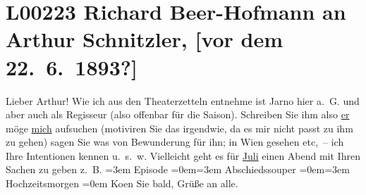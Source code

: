 

\section[Richard Beer-Hofmann an Arthur Schnitzler, {[}vor dem 22. 6. 1893?{]}]{L00223 Richard Beer-Hofmann an Arthur Schnitzler, {[}vor dem
               22. 6. 1893?{]}}
\nopagebreak{}
\rehead{ }\normalsize\beginnumbering{}
\toendnotes[C]{\smallbreak\pagebreak[2]}
\toendnotes[C]{\smallbreak}
\pstart
           \textcolor{gray}{\textbf{\label{T_L00223-1v}\label{T_L00223-1}}}\pend
           
\pstart{}{\pb}Lieber Arthur!\pend\vspace{0.5em}
\pstart
           Wie ich aus den Theaterzetteln entnehme ist Jarno hier a. G. und aber auch als Regisseur (also offenbar für die Saison).
               Schreiben Sie ihm also \uline{er} möge \uline{mich} aufsuchen (motiviren Sie das irgendwie, da es mir nicht passt zu
               ihm zu gehen) sagen {\pb}Sie was von
               Bewunderung für ihn; in Wien gesehen etc, – ich
               Ihre Intentionen kennen u. s. w. Vielleicht geht es für \uline{Juli} einen Abend mit Ihren Sachen zu geben z. B.\pend
           \leftskip=3em{}
\pstart
           \noindent{}Episode\pend
           \leftskip=0em{}\leftskip=3em{}
\pstart
           Abschiedssouper\pend
           \leftskip=0em{}\leftskip=3em{}
\pstart
           Hochzeitsmorgen\pend
           \leftskip=0em{}
\pstart
           Ko{\geminationm}en Sie bald, Grüße an alle.\pend
           

